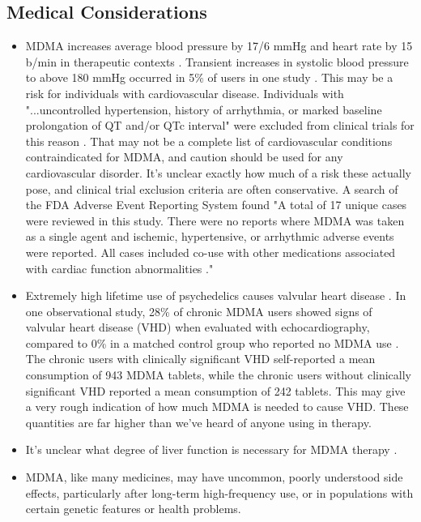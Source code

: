 \documentclass[12pt,letterpaper]{book}
\begin{document}
\subsection*{Medical Considerations}
\begin{itemize}
    \item MDMA increases average blood pressure by 17/6 mmHg and heart rate by 15 b/min in therapeutic contexts \cite{mitchellMDMAClinicalTrial}. Transient increases in systolic blood pressure to above 180 mmHg occurred in 5\% of users in one study \cite{vizeliActuteEffects}. This may be a risk for individuals with cardiovascular disease. Individuals with "...uncontrolled hypertension, history of arrhythmia, or marked baseline prolongation of QT and/or QTc interval" were excluded from clinical trials for this reason \cite{mitchellMDMAClinicalTrial2}. That may not be a complete list of cardiovascular conditions contraindicated for MDMA, and caution should be used for any cardiovascular disorder. It's unclear exactly how much of a risk these actually pose, and clinical trial exclusion criteria are often conservative. A search of the FDA Adverse Event Reporting System found "A total of 17 unique cases were reviewed in this study. There were no reports where MDMA was taken as a single agent and ischemic, hypertensive, or arrhythmic adverse events were reported. All cases included co-use with other medications associated with cardiac function abnormalities \cite{makunts2023concomitant}."
    \item Extremely high lifetime use of psychedelics causes valvular heart disease \cite{droogmans2007valvular,tagen2023valvular}. In one observational study, 28\% of chronic MDMA users showed signs of valvular heart disease (VHD) when evaluated with echocardiography, compared to 0\% in a matched control group who reported no MDMA use \cite{droogmans2007valvular}. The chronic users with clinically significant VHD self-reported a mean consumption of 943 MDMA tablets, while the chronic users without clinically significant VHD reported a mean consumption of 242 tablets. This may give a very rough indication of how much MDMA is needed to cause VHD. These quantities are far higher than we've heard of anyone using in therapy.
    \item It's unclear what degree of liver function is necessary for MDMA therapy \cite{krausCirrhosis}.
    \item MDMA, like many medicines, may have uncommon, poorly understood side effects, particularly after long-term high-frequency use, or in populations with certain genetic features or health problems.

\end{itemize}
\end{document}
